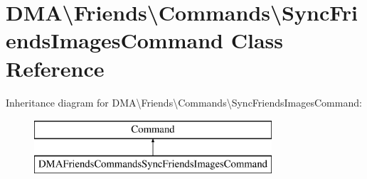 \hypertarget{classDMA_1_1Friends_1_1Commands_1_1SyncFriendsImagesCommand}{\section{D\+M\+A\textbackslash{}Friends\textbackslash{}Commands\textbackslash{}Sync\+Friends\+Images\+Command Class Reference}
\label{classDMA_1_1Friends_1_1Commands_1_1SyncFriendsImagesCommand}
}
Inheritance diagram for D\+M\+A\textbackslash{}Friends\textbackslash{}Commands\textbackslash{}Sync\+Friends\+Images\+Command\+:\begin{figure}[H]
\begin{center}
\leavevmode
\includegraphics[height=2.000000cm]{d0/da8/classDMA_1_1Friends_1_1Commands_1_1SyncFriendsImagesCommand}
\end{center}
\end{figure}
